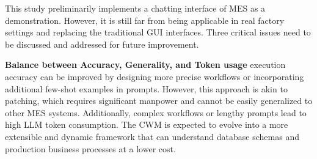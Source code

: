 \documentclass[preprint,12pt]{elsarticle}
\begin{document}








This study preliminarily implements a chatting interface of MES as a demonstration.
However, it is still far from being applicable in real factory settings and replacing the traditional GUI interfaces.
Three critical issues need to be discussed and addressed for future improvement.

\textbf{Balance between Accuracy, Generality, and Token usage}
execution accuracy can be improved by designing more precise workflows or incorporating additional few-shot examples in prompts. However, this approach is akin to patching, which requires significant manpower and cannot be easily generalized to other MES systems. Additionally, complex workflows or lengthy prompts lead to high LLM token consumption.
The CWM is expected to evolve into a more extensible and dynamic framework that can understand database schemas and production business processes at a lower cost.
\end{document}
